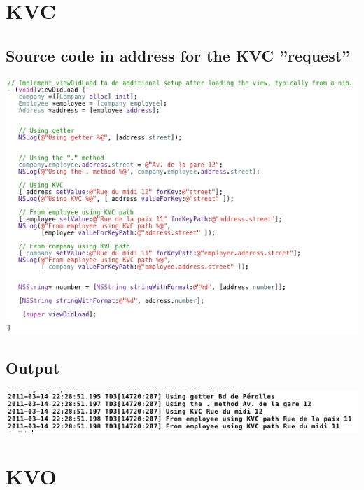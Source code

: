 \documentclass[a4paper,10pt]{article}
\begin{document}
	
	
	
	
	\section{KVC  }
		\subsection{Source code in address for the KVC  ''request'' }
		\begin{center}
					 \includegraphics[width=1\textwidth]{./images/srcKVC.png}
		\end{center}
		\subsection{Output }
				\begin{center}
							 \includegraphics[width=1\textwidth]{./images/resultKVC.png}
				\end{center}
		\section{ KVO }
\end{document}

